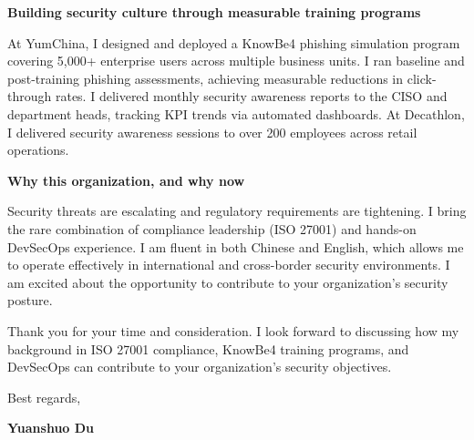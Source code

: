 \documentclass{coverletter}
\begin{document}
\vspace{0.35cm}

\noindent%
{\color{secondary}\sffamily\small\bfseries
  Building security culture through measurable training programs
}

\vspace{0.20cm}

\noindent%
{\color{secondary}\sffamily\small
  At YumChina, I designed and deployed a KnowBe4 phishing simulation program covering 5,000+ enterprise users across multiple business units. I ran baseline and post-training phishing assessments, achieving measurable reductions in click-through rates. I delivered monthly security awareness reports to the CISO and department heads, tracking KPI trends via automated dashboards. At Decathlon, I delivered security awareness sessions to over 200 employees across retail operations.
}

\vspace{0.35cm}

\noindent%
{\color{secondary}\sffamily\small\bfseries
  Why this organization, and why now
}

\vspace{0.20cm}

\noindent%
{\color{secondary}\sffamily\small
  Security threats are escalating and regulatory requirements are tightening. I bring the rare combination of compliance leadership (ISO 27001) and hands-on DevSecOps experience. I am fluent in both Chinese and English, which allows me to operate effectively in international and cross-border security environments. I am excited about the opportunity to contribute to your organization's security posture.
}

\vspace{0.35cm}

\noindent%
{\color{secondary}\sffamily\small
  Thank you for your time and consideration. I look forward to discussing how my background in ISO 27001 compliance, KnowBe4 training programs, and DevSecOps can contribute to your organization's security objectives.
}

\vspace{0.30cm}

\noindent%
{\color{secondary}\sffamily\small
  Best regards,
}

\vspace{0.10cm}

\noindent%
{\sffamily\small\color{namecolor}\bfseries
  Yuanshuo Du
}
\end{document}
